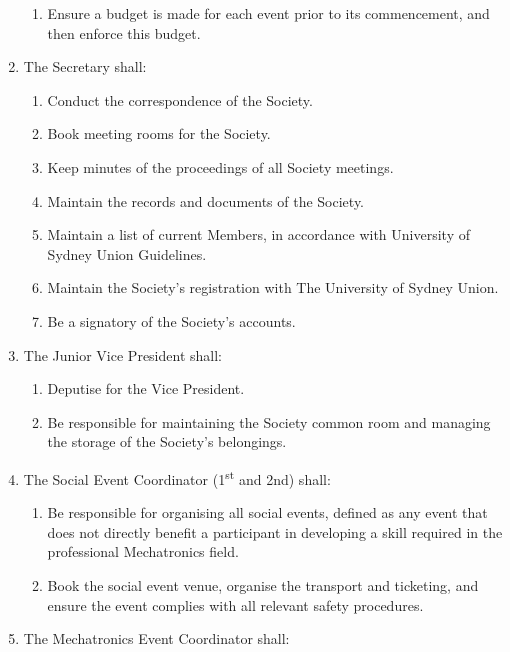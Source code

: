 \documentclass[11pt]{article}
\begin{document}
\begin{enumerate}[\thesection .1]
\begin{enumerate}
        \item Ensure a budget is made for each event prior to its commencement, and then enforce this budget.
    \end{enumerate}
    \item The Secretary shall:
    \begin{enumerate}
        \item Conduct the correspondence of the Society.
        \item Book meeting rooms for the Society.
        \item Keep minutes of the proceedings of all Society meetings.
        \item Maintain the records and documents of the Society.
        \item Maintain a list of current Members, in accordance with University of Sydney Union Guidelines.
        \item Maintain the Society’s registration with The University of Sydney Union.
        \item Be a signatory of the Society’s accounts.
    \end{enumerate}
    \item The Junior Vice President shall:
    \begin{enumerate}
        \item Deputise for the Vice President.
        \item Be responsible for maintaining the Society common room and managing the storage of the Society's belongings.
    \end{enumerate}
    \item The Social Event Coordinator (1\textsuperscript{st} and 2nd) shall:
    \begin{enumerate}
        \item Be responsible for organising all social events, defined as any event that does not directly benefit a participant in developing a skill required in the professional Mechatronics field.
        \item Book the social event venue, organise the transport and ticketing, and ensure the event complies with all relevant safety procedures.
    \end{enumerate}
    \item The Mechatronics Event Coordinator shall:

\end{enumerate}
\end{document}
